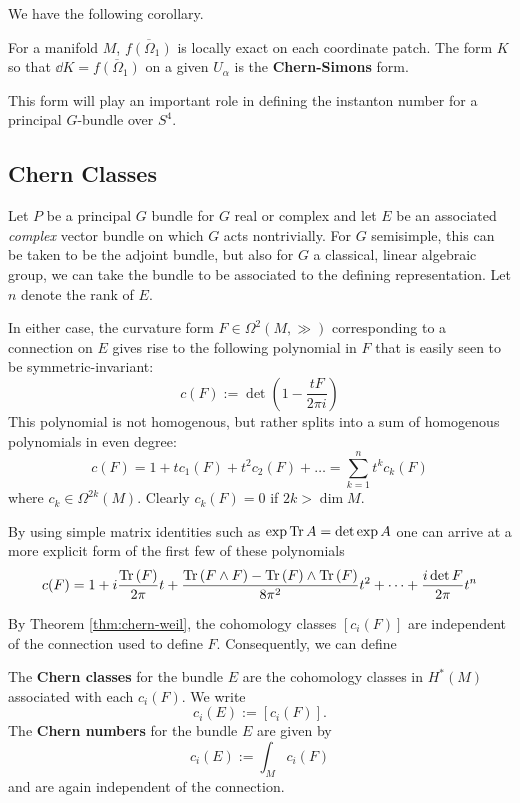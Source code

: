 		We have the following corollary. 
		\begin{cor}
			For a manifold $M$, $\overline{f(\Omega_1)}$ is locally exact on each coordinate patch. The form $K$ so that $\dd K = \overline{f(\Omega_1)}$ on a given $U_\alpha$ is the \textbf{Chern-Simons} form.
		\end{cor}
		This form will play an important role in defining the instanton number for a principal $G$-bundle over $S^4$.
		
		\subsection{Chern Classes}
		
		Let $P$ be a principal $G$ bundle for $G$ real or complex and let $E$ be an associated \emph{complex} vector bundle on which $G$ acts nontrivially. For $G$ semisimple, this can be taken to be the adjoint bundle, but also for $G$ a classical, linear algebraic group, we can take the bundle to be associated to the defining representation. Let $n$ denote the rank of $E$.
		
		In either case, the curvature form $F \in \Omega^2(M, \gg)$ corresponding to a connection on $E$ gives rise to the following polynomial in $F$ that is easily seen to be symmetric-invariant:
		\begin{equation}
			c(F) := \det(1 - \frac{t F}{2\pi i})
		\end{equation}
		This polynomial is not homogenous, but rather splits into a sum of homogenous polynomials in even degree:
		\begin{equation}
			c(F) = 1 + t c_1(F) + t^2 c_2(F) + \dots = \sum_{k=1}^n t^k c_k(F)
		\end{equation}
		where $c_k \in \Omega^{2k}(M)$. Clearly $c_k(F) = 0$ if $2k > \dim M$.
		
		By using simple matrix identities such as $\exp{\mathrm{Tr}\,A} = \det \exp A$ one can arrive at a more explicit form of the first few of these polynomials
		\[
			c(F) = 1 + i \frac{\mathrm{Tr}\,(F)}{2\pi} t + \frac{\mathrm{Tr}\,(F \wedge F) - \mathrm{Tr}\,(F) \wedge \mathrm{Tr}\,(F)}{8\pi^2} t^2 + \dots + \frac{i \det F}{2\pi} t^n
		\]
		
		 By Theorem \ref{thm:chern-weil}, the cohomology classes $[c_i(F)]$ are independent of the connection used to define $F$. Consequently, we can define 
		 \begin{defn} \label{defn:chern}
		 	The \textbf{Chern classes} for the bundle $E$ are the cohomology classes in $H^*(M)$ associated with each $c_i(F)$. We write 
			\[
				c_i(E) := [c_i (F)].
			\]
			The \textbf{Chern numbers} for the bundle $E$ are given by
			\[
				c_i(E) := \int_{M} c_i(F)
			\]
			and are again independent of the connection. 
		 \end{defn}
		 
